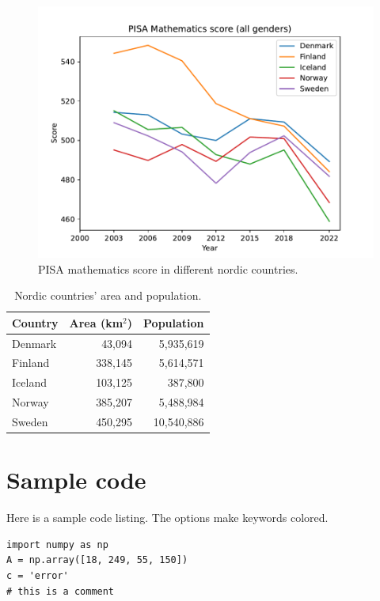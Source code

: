 \documentclass[a4paper]{article}
\begin{document}
\begin{figure}[htb]
  \begin{center}
    \includegraphics[width=\textwidth]{pisa_mathematics_in_nordic_countries.pdf}
    \caption{PISA mathematics score in different nordic countries.}
    \label{fig:example1}
  \end{center}
\end{figure}

\begin{table}[htb]
  \begin{center}
    \caption{Nordic countries' area and population.}
    \label{tbl:example2}
    \begin{tabular}{l|rr}
      Country & Area (km$^2$) & Population \\\hline
      Denmark & 43,094 & 5,935,619 \\
      Finland & 338,145 & 5,614,571 \\
      Iceland & 103,125 & 387,800 \\
      Norway  & 385,207 & 5,488,984 \\
      Sweden  & 450,295 & 10,540,886 \\
    \end{tabular}
  \end{center}
\end{table}


\printbibliography

\appendix

\section{Sample code}
\label{app:samplecode}

Here is a sample code listing. The options make keywords colored.

\begin{lstlisting}
import numpy as np
A = np.array([18, 249, 55, 150])
c = 'error'
# this is a comment
\end{lstlisting}
\end{document}
